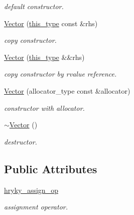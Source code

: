 \begin{DoxyCompactItemize}
\begin{DoxyCompactList}\small\item\em default constructor. \end{DoxyCompactList}\item 
\hypertarget{classhryky_1_1_vector_add56505400891e26f0b370ed65bb1797}{\hyperlink{classhryky_1_1_vector_add56505400891e26f0b370ed65bb1797}{Vector} (\hyperlink{classhryky_1_1_vector}{this\-\_\-type} const \&rhs)}\label{classhryky_1_1_vector_add56505400891e26f0b370ed65bb1797}

\begin{DoxyCompactList}\small\item\em copy constructor. \end{DoxyCompactList}\item 
\hypertarget{classhryky_1_1_vector_ac10a64873fb488567b3a47d631129345}{\hyperlink{classhryky_1_1_vector_ac10a64873fb488567b3a47d631129345}{Vector} (\hyperlink{classhryky_1_1_vector}{this\-\_\-type} \&\&rhs)}\label{classhryky_1_1_vector_ac10a64873fb488567b3a47d631129345}

\begin{DoxyCompactList}\small\item\em copy constructor by rvalue reference. \end{DoxyCompactList}\item 
\hypertarget{classhryky_1_1_vector_a0ae18c032f267cdbadf0860df6000fdf}{\hyperlink{classhryky_1_1_vector_a0ae18c032f267cdbadf0860df6000fdf}{Vector} (allocator\-\_\-type const \&allocator)}\label{classhryky_1_1_vector_a0ae18c032f267cdbadf0860df6000fdf}

\begin{DoxyCompactList}\small\item\em constructor with allocator. \end{DoxyCompactList}\item 
\hypertarget{classhryky_1_1_vector_a1d48f3026e8efefba8f1b441d71e1dca}{\hyperlink{classhryky_1_1_vector_a1d48f3026e8efefba8f1b441d71e1dca}{$\sim$\-Vector} ()}\label{classhryky_1_1_vector_a1d48f3026e8efefba8f1b441d71e1dca}

\begin{DoxyCompactList}\small\item\em destructor. \end{DoxyCompactList}\end{DoxyCompactItemize}
\subsection*{Public Attributes}
\begin{DoxyCompactItemize}
\item 
\hypertarget{classhryky_1_1_vector_adb9ccf33925c60de6918a8a581dbfa22}{\hyperlink{classhryky_1_1_vector_adb9ccf33925c60de6918a8a581dbfa22}{hryky\-\_\-assign\-\_\-op}}\label{classhryky_1_1_vector_adb9ccf33925c60de6918a8a581dbfa22}

\begin{DoxyCompactList}\small\item\em assignment operator. \end{DoxyCompactList}\end{DoxyCompactItemize}


